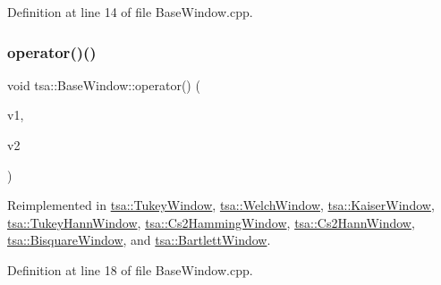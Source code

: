 Definition at line 14 of file Base\+Window.\+cpp.

\mbox{\label{classtsa_1_1_base_window_afda50daa943527e09792b06e5ba69bcb}} 
\subsubsection{\texorpdfstring{operator()()}{operator()()}\hspace{0.1cm}{\footnotesize\ttfamily [2/3]}}
{\footnotesize\ttfamily void tsa\+::\+Base\+Window\+::operator() (\begin{DoxyParamCaption}\item[{\hyperlink{namespacetsa_ac599574bcc094eda25613724b8f3ca9e}{Seq\+View\+Double} \&}]{v1,  }\item[{\hyperlink{namespacetsa_ac599574bcc094eda25613724b8f3ca9e}{Seq\+View\+Double} \&}]{v2 }\end{DoxyParamCaption})\hspace{0.3cm}{\ttfamily [virtual]}}



Reimplemented in \hyperlink{classtsa_1_1_tukey_window_ad38a8c9b6fa12b65d3f7c7b37f4b19a8}{tsa\+::\+Tukey\+Window}, \hyperlink{classtsa_1_1_welch_window_af6d14e181526f94d8ad6f1a2176db98a}{tsa\+::\+Welch\+Window}, \hyperlink{classtsa_1_1_kaiser_window_a94b99f1c961eadad783e44ccce9629e7}{tsa\+::\+Kaiser\+Window}, \hyperlink{classtsa_1_1_tukey_hann_window_af889453b564781f9eca6993f2fd95646}{tsa\+::\+Tukey\+Hann\+Window}, \hyperlink{classtsa_1_1_cs2_hamming_window_a98046f7488d9126a9041b16852491dd9}{tsa\+::\+Cs2\+Hamming\+Window}, \hyperlink{classtsa_1_1_cs2_hann_window_adc0b74ee1e5173f5de7f86cf714fe47f}{tsa\+::\+Cs2\+Hann\+Window}, \hyperlink{classtsa_1_1_bisquare_window_a18002b225ed630af739a983da72a4006}{tsa\+::\+Bisquare\+Window}, and \hyperlink{classtsa_1_1_bartlett_window_a44d722552ca5281e28a28eadbed2099e}{tsa\+::\+Bartlett\+Window}.



Definition at line 18 of file Base\+Window.\+cpp.

\mbox{\label{classtsa_1_1_base_window_ab9dc5e39e09701b60b9e160837f059df}} 
